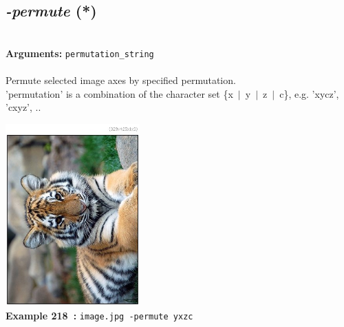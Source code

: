 \documentclass[a4paper,11pt,twoside]{book}
\begin{document}
\subsection{\emph{-permute} (*)}\vspace*{-0.5em}
~\\\textbf{Arguments: } 
{\small \texttt{permutation\_string}}\\~\\
Permute selected image axes by specified permutation.
~\\'permutation' is a combination of the character set \{x~$|$~y~$|$~z~$|$~c\},
e.g. 'xycz', 'cxyz', ..
\begin{center}\includegraphics[keepaspectratio=true,height=7cm,width=\textwidth]{img/gmic_def218.jpg}\\
{\footnotesize \textbf{Example 218~:} \texttt{image.jpg -permute yxzc}}
\end{center}
\end{document}
